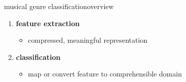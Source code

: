         \begin{frame}{musical genre classification}{overview}
            \begin{figure}
                
            \end{figure}
            \begin{enumerate}
                    \item	\textbf{feature extraction}
                            \begin{itemize}
                                \item 	compressed, meaningful representation
                            \end{itemize}
                    \bigskip
                    \item<2->	\textbf{classification}
                            \begin{itemize}
                                \item	map or convert feature to comprehensible domain
                            \end{itemize}
            \end{enumerate}
        \end{frame}

